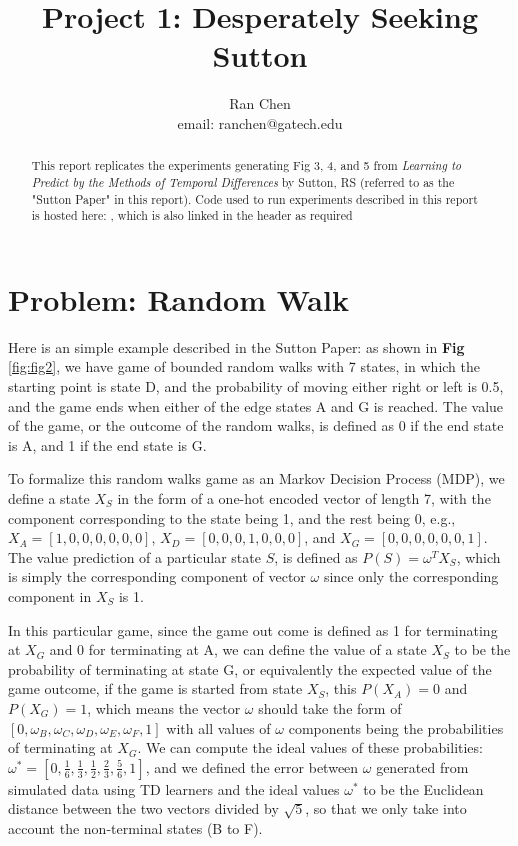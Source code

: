 \documentclass[10pt]{article}
\author{Ran Chen \\ email: ranchen@gatech.edu\vspace{-2ex}}
\title{\vspace{-1.8cm}Project 1: Desperately Seeking Sutton}
\date{}
\begin{document}
\maketitle
\thispagestyle{fancy}


\begin{abstract}
This report replicates the experiments generating Fig 3, 4, and 5 from \textit{Learning to Predict by the Methods of Temporal Differences}\cite{SuttonLearningPredictMethods1988} by Sutton, RS (referred to as the "Sutton Paper" in this report). Code used to run experiments described in this report is hosted here: , which is also linked in the header as required
\end{abstract}

\section{Problem: Random Walk} \label{problem}

Here is an simple example described in the Sutton Paper: as shown in \textbf{Fig} \ref{fig:fig2}, we have game of bounded random walks with 7 states, in which the starting point is state D, and the probability of moving either right or left is 0.5, and the game ends when either of the edge states A and G is reached. The value of the game, or the outcome of the random walks, is defined as 0 if the end state is A, and 1 if the end state is G. \par

To formalize this random walks game as an Markov Decision Process (MDP), we define a state $X_S$ in the form of a one-hot encoded vector of length 7, with the component corresponding to the state being 1, and the rest being 0, e.g., $X_A=[1,0,0,0,0,0,0]$, $X_D=[0,0,0,1,0,0,0]$, and $X_G=[0,0,0,0,0,0,1]$. The value prediction of a particular state $S$, is defined as $P(S)=\omega^TX_S$, which is simply the corresponding component of vector $\omega$ since only the corresponding component in $X_S$ is 1. \par

In this particular game, since the game out come is defined as 1 for terminating at $X_G$ and 0 for terminating at A, we can define the value of a state $X_S$ to be the probability of terminating at state G, or equivalently the expected value of the game outcome, if the game is started from state $X_S$, this $P(X_A)=0$ and $P(X_G)=1$, which means the vector $\omega$ should take the form of $[0,\omega_B,\omega_C,\omega_D,\omega_E,\omega_F,1]$ with all values of $\omega$ components being the probabilities of terminating at $X_G$. We can compute the ideal values of these probabilities: $\omega^*=[0,\frac{1}{6},\frac{1}{3},\frac{1}{2},\frac{2}{3},\frac{5}{6},1]$, and we defined the error between $\omega$ generated from simulated data using TD learners and the ideal values $\omega^*$ to be the Euclidean distance between the two vectors divided by $\sqrt{5}$, so that we only take into account the non-terminal states (B to F). \par
\end{document}
